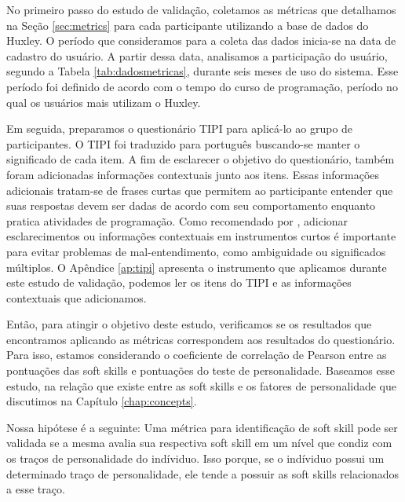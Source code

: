 No primeiro passo do estudo de validação, coletamos as métricas que detalhamos na Seção \ref{sec:metrics} para cada participante utilizando a base de dados do Huxley. O período que consideramos para a coleta das dados inicia-se na data de cadastro do usuário. A partir dessa data, analisamos a participação do usuário, segundo a Tabela \ref{tab:dadosmetricas}, durante seis meses de uso do sistema. Esse período foi definido de acordo com o tempo do curso de programação, período no qual os usuários mais utilizam o Huxley.%

Em seguida, preparamos o questionário TIPI para aplicá-lo ao grupo de participantes. O TIPI foi traduzido para português buscando-se manter o significado de cada item. A fim de esclarecer o objetivo do questionário, também foram adicionadas informações contextuais junto aos itens. Essas informações adicionais tratam-se de frases curtas que permitem ao participante entender que suas respostas devem ser dadas de acordo com seu comportamento enquanto pratica atividades de programação. Como recomendado por \cite{john:99}, adicionar esclarecimentos ou informações contextuais em instrumentos curtos é importante para evitar problemas de mal-entendimento, como ambiguidade ou significados múltiplos.
O Apêndice \ref{ap:tipi} apresenta o instrumento que aplicamos durante este estudo de validação, podemos ler os itens do TIPI e as informações contextuais que adicionamos.

Então, para atingir o objetivo deste estudo, verificamos se os resultados que encontramos aplicando as métricas correspondem aos resultados do questionário.
Para isso, estamos considerando o coeficiente de correlação de Pearson entre as pontuações das soft skills e pontuações do teste de personalidade.
Baseamos esse estudo, na relação que existe entre as soft skills e os fatores de personalidade que discutimos na Capítulo \ref{chap:concepts}.

Nossa hipótese é a seguinte: Uma métrica para identificação de soft skill pode ser validada se a mesma avalia sua respectiva soft skill em um nível que condiz com os traços de personalidade do indíviduo. Isso porque, se o indíviduo possui um determinado traço de personalidade, ele tende a possuir as soft skills relacionados a esse traço.
